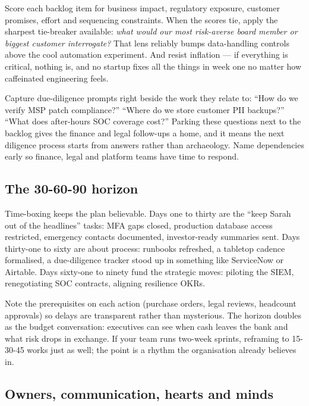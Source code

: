 Score each backlog item for business impact, regulatory exposure, customer promises, effort and sequencing constraints. When the scores tie, apply the sharpest tie-breaker available: \emph{what would our most risk-averse board member or biggest customer interrogate?} That lens reliably bumps data-handling controls above the cool automation experiment. And resist inflation — if everything is critical, nothing is, and no startup fixes all the things in week one no matter how caffeinated engineering feels.


Capture due-diligence prompts right beside the work they relate to: ``How do we verify MSP patch compliance?'' ``Where do we store customer PII backups?'' ``What does after-hours SOC coverage cost?'' Parking these questions next to the backlog gives the finance and legal follow-ups a home, and it means the next diligence process starts from answers rather than archaeology. Name dependencies early so finance, legal and platform teams have time to respond.



\subsection{The 30-60-90 horizon}


Time-boxing keeps the plan believable. Days one to thirty are the ``keep Sarah out of the headlines'' tasks: MFA gaps closed, production database access restricted, emergency contacts documented, investor-ready summaries sent. Days thirty-one to sixty are about process: runbooks refreshed, a tabletop cadence formalised, a due-diligence tracker stood up in something like ServiceNow or Airtable. Days sixty-one to ninety fund the strategic moves: piloting the SIEM, renegotiating SOC contracts, aligning resilience OKRs.


Note the prerequisites on each action (purchase orders, legal reviews, headcount approvals) so delays are transparent rather than mysterious. The horizon doubles as the budget conversation: executives can see when cash leaves the bank and what risk drops in exchange. If your team runs two-week sprints, reframing to 15-30-45 works just as well; the point is a rhythm the organisation already believes in.



\subsection{Owners, communication, hearts and minds}


